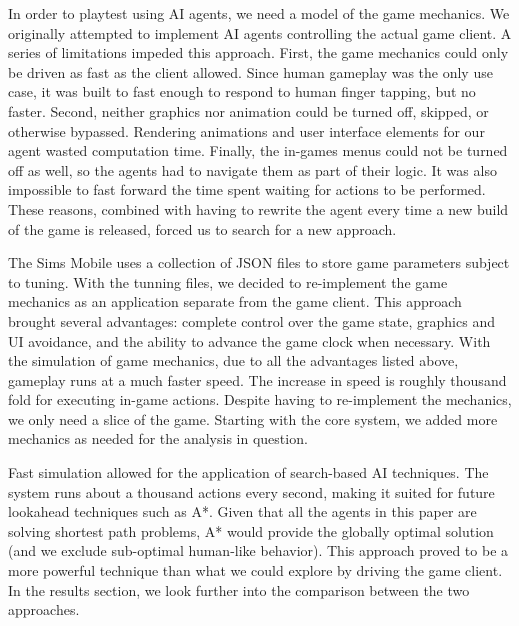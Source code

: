 \documentclass[letterpaper]{article} %
\begin{document}
In order to playtest using AI agents, we need a model of the game mechanics. We originally attempted to implement AI agents controlling the actual game client. A series of limitations impeded this approach. First, the game mechanics could only be driven as fast as the client allowed. Since human gameplay was the only use case, it was built to fast enough to respond to human finger tapping, but no faster.  Second, neither graphics nor animation could be turned off, skipped, or otherwise bypassed. Rendering animations and user interface elements for our agent wasted computation time. Finally, the in-games menus could not be turned off as well, so the agents had to navigate them as part of their logic. It was also impossible to fast forward the time spent waiting for actions to be performed. These reasons, combined with having to rewrite the agent every time a new build of the game is released, forced us to search for a new approach.

The Sims Mobile uses a collection of JSON files to store game parameters subject to tuning. 
With the tunning files, we decided to re-implement the game mechanics as an application separate from the game client. This approach brought several advantages: complete control over the game state, graphics and UI avoidance, and the ability to advance the game clock when necessary. With the simulation of game mechanics, due to all the advantages listed above, gameplay runs at a much faster speed. The increase in speed is roughly thousand fold for  executing in-game actions. Despite having to re-implement the mechanics, we only need a slice of the game. Starting with the core system, we added more mechanics as needed for the analysis in question.

Fast simulation allowed for the application of search-based AI techniques. The system runs about a thousand actions every second, making it suited for future lookahead techniques such as A*. Given that all the agents in this paper are solving shortest path problems, A* would provide the globally optimal solution (and we exclude sub-optimal human-like behavior). This approach proved to be a more powerful technique than what we could explore by driving the game client. In the results section, we look further into the comparison between the two approaches.
\end{document}
